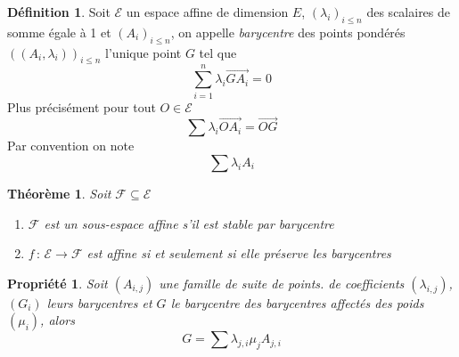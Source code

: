 \documentclass[]{article}
\newtheorem{mythm}{Théorème}
\newtheorem{myproperty}{Propriété}
\theoremstyle{remark}
\theoremstyle{definition}
\newtheorem{mydef}{Définition}
\newcommand{\funcshort}[3]{
	#1 \, : \, #2 \longrightarrow #3
}
\begin{document}
\begin{mydef}
	Soit $\mathcal{E}$ un espace affine de dimension $E$, $(\lambda_i)_{i \leqslant n}$ des scalaires de somme égale à 1 et $(A_i)_{i \leqslant n}$, on appelle \textit{barycentre} des points pondérés $((A_i, \lambda_i))_{i \leqslant n}$ l'unique point $G$ tel que
	$$\sum_{i = 1}^{n} \lambda_i \overrightarrow{GA_i} = 0$$
	Plus précisément pour tout $O \in \mathcal{E}$
	$$\sum \lambda_i \overrightarrow{OA_i} = \overrightarrow{OG}$$
	Par convention on note
	$$\sum \lambda_i A_i$$
\end{mydef}

\begin{mythm}Soit $\mathcal{F} \subseteq \mathcal{E}$
	\begin{enumerate}
		\item $\mathcal{F}$ est un sous-espace affine s'il est stable par barycentre
		\item $\funcshort{f}{\mathcal{E}}{\mathcal{F}}$ est affine si et seulement si elle préserve les barycentres
	\end{enumerate}
\end{mythm}

\begin{myproperty}
	Soit $(A_{i, j})$ une famille de suite de points. de coefficients $(\lambda_{i, j})$, $(G_i)$ leurs barycentres et $G$ le barycentre des barycentres affectés des poids $(\mu_i)$, alors $$G = \sum \lambda_{j, i} \mu_j A_{j, i}$$
\end{myproperty}
\end{document}
